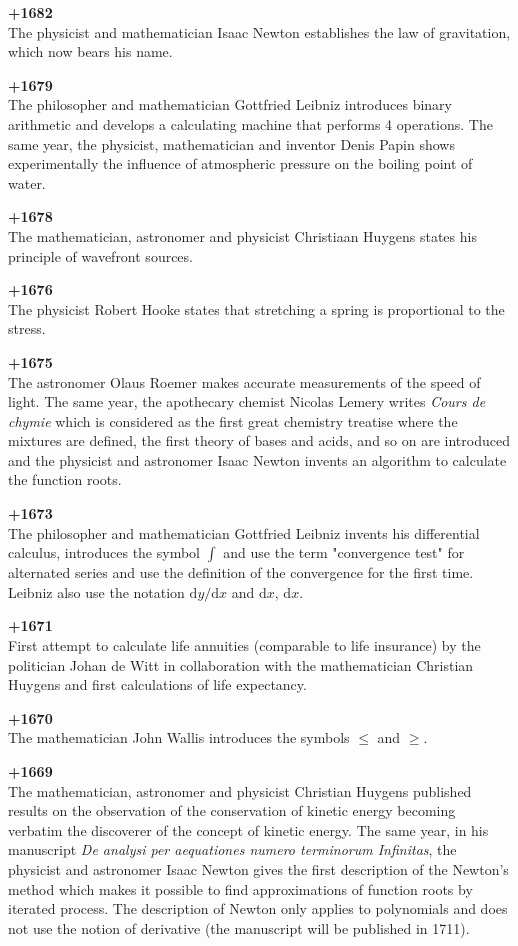 \textbf{+1682}\\
The physicist and mathematician Isaac Newton establishes the law of gravitation, which now bears his name.

\textbf{+1679}\\
The philosopher and mathematician Gottfried Leibniz introduces binary arithmetic and develops a calculating machine that performs 4 operations. The same year, the physicist, mathematician and inventor Denis Papin shows experimentally the influence of atmospheric pressure on the boiling point of water.

\textbf{+1678}\\
The mathematician, astronomer and physicist Christiaan Huygens states his principle of wavefront sources.

\textbf{+1676}\\
The physicist Robert Hooke states that stretching a spring is proportional to the stress.

\textbf{+1675}\\
The astronomer Olaus Roemer makes accurate measurements of the speed of light. The same year, the apothecary chemist Nicolas Lemery writes \textit{Cours de chymie} which is considered as the first great chemistry treatise where the mixtures are defined, the first theory of bases and acids, and so on are introduced and the physicist and astronomer Isaac Newton invents an algorithm to calculate the function roots.

\textbf{+1673}\\
The philosopher and mathematician Gottfried Leibniz invents his differential calculus, introduces the symbol $\int$ and use the term "convergence test" for alternated series and use the definition of the convergence for the first time. Leibniz also use the notation $\mathrm{d}y/\mathrm{d}x$ and $\mathrm{d}x$, $\mathrm{d}x$.

\textbf{+1671}\\
First attempt to calculate life annuities (comparable to life insurance) by the politician Johan de Witt in collaboration with the mathematician Christian Huygens and first calculations of life expectancy.

\textbf{+1670}\\
The mathematician John Wallis introduces the symbols $\le$ and $\ge$.

\textbf{+1669}\\
The mathematician, astronomer and physicist Christian Huygens published results on the observation of the conservation of kinetic energy becoming verbatim the discoverer of the concept of kinetic energy. The same year, in his manuscript \textit{De analysi per aequationes numero terminorum Infinitas}, the physicist and astronomer Isaac Newton gives the first description of the Newton's method which makes it possible to find approximations of function roots by iterated process. The description of Newton only applies to polynomials and does not use the notion of derivative (the manuscript will be published in 1711).

